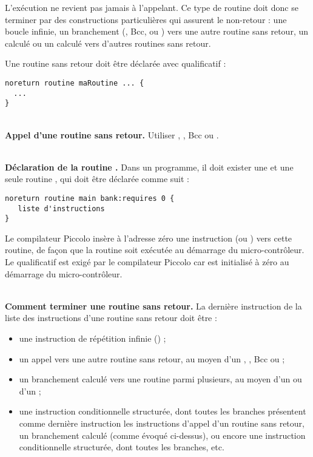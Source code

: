 L’exécution ne revient pas jamais à l’appelant. Ce type de routine doit donc se terminer par des constructions particulières qui assurent le non-retour : une boucle infinie, un branchement (, Bcc,  ou ) vers une autre routine sans retour, un  calculé ou un  calculé vers d’autres routines sans retour.

Une routine sans retour doit être déclarée avec qualificatif  :
\begin{lstlisting}[language=piccolo]
noreturn routine maRoutine ... {
  ...
}
\end{lstlisting}

~\\
\textbf{Appel d’une routine sans retour.} Utiliser , , Bcc ou .


~\\
\textbf{Déclaration de la routine .} Dans un programme, il doit exister une et une seule routine , qui doit être déclarée comme suit :

\begin{lstlisting}[language=piccolo]
noreturn routine main bank:requires 0 {
   liste d'instructions
}

\end{lstlisting}

Le compilateur Piccolo insère à l’adresse zéro une instruction  (ou ) vers cette routine, de façon que la routine  soit exécutée au démarrage du micro-contrôleur. Le qualificatif  est exigé par le compilateur Piccolo car  est initialisé à zéro au démarrage du micro-contrôleur.


~\\
\textbf{Comment terminer une routine sans retour.} La dernière instruction de la liste des instructions d’une routine sans retour doit être :
\begin{itemize}
  \item une instruction de répétition infinie () ;
  \item un appel vers une autre routine sans retour, au moyen d’un , , Bcc ou  ;
  \item un branchement calculé vers une routine parmi plusieurs, au moyen d’un  ou d’un  ;
  \item une instruction conditionnelle structurée, dont toutes les branches présentent comme dernière instruction les instructions d’appel d’un routine sans retour, un branchement calculé (comme évoqué ci-dessus), ou encore une instruction conditionnelle structurée, dont toutes les branches, etc.

\end{itemize}

